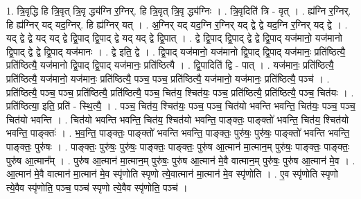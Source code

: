 \documentclass[17pt]{extarticle}
\begin{document}
1. त्रि॒वृद्धि हि त्रि॒वृत् त्रि॒वृ द्ध्य॑ग्नि र॒ग्निर्. हि त्रि॒वृत् त्रि॒वृ द्ध्य॑ग्निः । . त्रि॒वृदिति॑ त्रि - वृत् । . ह्य॑ग्नि र॒ग्निर्. हि ह्य॑ग्निर् यद् यद॒ग्निर्. हि ह्य॑ग्निर् यत् । . अ॒ग्निर् यद् यद॒ग्नि र॒ग्निर् यद् द्वे द्वे यद॒ग्नि र॒ग्निर् यद् द्वे । . यद् द्वे द्वे यद् यद् द्वे द्वि॒पाद् द्वि॒पाद् द्वे यद् यद् द्वे द्वि॒पात् । . द्वे द्वि॒पाद् द्वि॒पाद् द्वे द्वे द्वि॒पाद् यज॑मानो॒ यज॑मानो द्वि॒पाद् द्वे द्वे द्वि॒पाद् यज॑मानः । . द्वे इति॒ द्वे । . द्वि॒पाद् यज॑मानो॒ यज॑मानो द्वि॒पाद् द्वि॒पाद् यज॑मानः॒ प्रति॑ष्ठित्यै॒ प्रति॑ष्ठित्यै॒ यज॑मानो द्वि॒पाद् द्वि॒पाद् यज॑मानः॒ प्रति॑ष्ठित्यै । . द्वि॒पादिति॑ द्वि - पात् । . यज॑मानः॒ प्रति॑ष्ठित्यै॒ प्रति॑ष्ठित्यै॒ यज॑मानो॒ यज॑मानः॒ प्रति॑ष्ठित्यै॒ पञ्च॒ पञ्च॒ प्रति॑ष्ठित्यै॒ यज॑मानो॒ यज॑मानः॒ प्रति॑ष्ठित्यै॒ पञ्च॑ । . प्रति॑ष्ठित्यै॒ पञ्च॒ पञ्च॒ प्रति॑ष्ठित्यै॒ प्रति॑ष्ठित्यै॒ पञ्च॒ चित॑य॒ श्चित॑यः॒ पञ्च॒ प्रति॑ष्ठित्यै॒ प्रति॑ष्ठित्यै॒ पञ्च॒ चित॑यः । . प्रति॑ष्ठित्या॒ इति॒ प्रति॑ - स्थि॒त्यै॒ । . पञ्च॒ चित॑य॒ श्चित॑यः॒ पञ्च॒ पञ्च॒ चित॑यो भवन्ति भवन्ति॒ चित॑यः॒ पञ्च॒ पञ्च॒ चित॑यो भवन्ति । . चित॑यो भवन्ति भवन्ति॒ चित॑य॒ श्चित॑यो भवन्ति॒ पाङ्क्तः॒ पाङ्क्तो॑ भवन्ति॒ चित॑य॒ श्चित॑यो भवन्ति॒ पाङ्क्तः॑ । . भ॒व॒न्ति॒ पाङ्क्तः॒ पाङ्क्तो॑ भवन्ति भवन्ति॒ पाङ्क्तः॒ पुरु॑षः॒ पुरु॑षः॒ पाङ्क्तो॑ भवन्ति भवन्ति॒ पाङ्क्तः॒ पुरु॑षः । . पाङ्क्तः॒ पुरु॑षः॒ पुरु॑षः॒ पाङ्क्तः॒ पाङ्क्तः॒ पुरु॑ष आ॒त्मान॑ मा॒त्मान॒म् पुरु॑षः॒ पाङ्क्तः॒ पाङ्क्तः॒ पुरु॑ष आ॒त्मान᳚म् । . पुरु॑ष आ॒त्मान॑ मा॒त्मान॒म् पुरु॑षः॒ पुरु॑ष आ॒त्मान॑ मे॒वै वात्मान॒म् पुरु॑षः॒ पुरु॑ष आ॒त्मान॑ मे॒व । . आ॒त्मान॑ मे॒वै वात्मान॑ मा॒त्मान॑ मे॒व स्पृ॑णोति स्पृणो त्ये॒वात्मान॑ मा॒त्मान॑ मे॒व स्पृ॑णोति । . ए॒व स्पृ॑णोति स्पृणो त्ये॒वैव स्पृ॑णोति॒ पञ्च॒ पञ्च॑ स्पृणो त्ये॒वैव स्पृ॑णोति॒ पञ्च॑ । \newline
\end{document}

